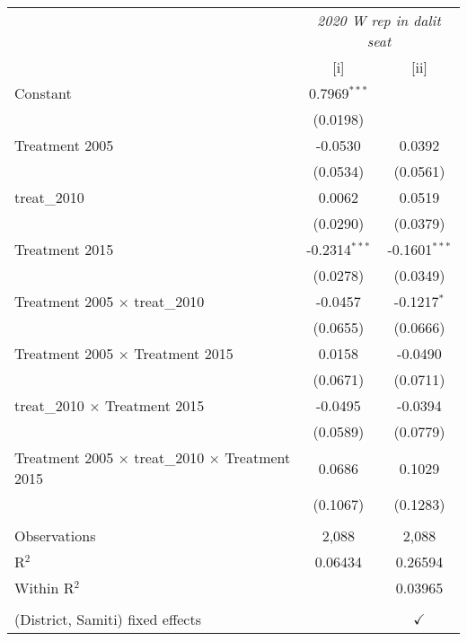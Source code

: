 
\begingroup
\centering
\begin{tabular}{lcc}
   \toprule
    & \multicolumn{2}{c}{\textit{2020 W rep in dalit seat}}\\
                                                                  & [i]             & [ii]\\  
   \midrule 
   Constant                                                       & 0.7969$^{***}$  &   \\   
                                                                  & (0.0198)        &   \\   
   Treatment 2005                                                 & -0.0530         & 0.0392\\   
                                                                  & (0.0534)        & (0.0561)\\   
   treat\_2010                                                    & 0.0062          & 0.0519\\   
                                                                  & (0.0290)        & (0.0379)\\   
   Treatment 2015                                                 & -0.2314$^{***}$ & -0.1601$^{***}$\\   
                                                                  & (0.0278)        & (0.0349)\\   
   Treatment 2005 $\times$ treat\_2010                            & -0.0457         & -0.1217$^{*}$\\   
                                                                  & (0.0655)        & (0.0666)\\   
   Treatment 2005 $\times$ Treatment 2015                         & 0.0158          & -0.0490\\   
                                                                  & (0.0671)        & (0.0711)\\   
   treat\_2010 $\times$ Treatment 2015                            & -0.0495         & -0.0394\\   
                                                                  & (0.0589)        & (0.0779)\\   
   Treatment 2005 $\times$ treat\_2010 $\times$ Treatment 2015    & 0.0686          & 0.1029\\   
                                                                  & (0.1067)        & (0.1283)\\   
    \\
   Observations                                                   & 2,088           & 2,088\\  
   R$^2$                                                          & 0.06434         & 0.26594\\  
   Within R$^2$                                                   &                 & 0.03965\\  
    \\
   (District, Samiti) fixed effects                               &                 & $\checkmark$\\   
   \bottomrule
\end{tabular}
\par\endgroup


